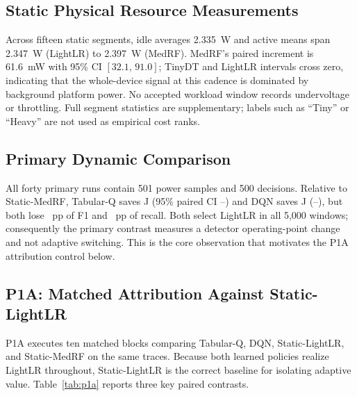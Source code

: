 \subsection{Static Physical Resource Measurements}
Across fifteen static segments, idle averages 2.335~W and active means span 2.347~W (LightLR) to 2.397~W (MedRF). MedRF's paired increment is 61.6~mW with 95\% CI $[32.1,\,91.0]$; TinyDT and LightLR intervals cross zero, indicating that the whole-device signal at this cadence is dominated by background platform power. No accepted workload window records undervoltage or throttling. Full segment statistics are supplementary; labels such as ``Tiny'' or ``Heavy'' are not used as empirical cost ranks.

\subsection{Primary Dynamic Comparison}
All forty primary runs contain 501 power samples and 500 decisions. Relative to Static-MedRF, Tabular-Q saves \TQSavingJ{} J (95\% paired CI \TQSavingJLow{}--\TQSavingJHigh{}) and DQN saves \DQSavingJ{} J (\DQSavingJLow{}--\DQSavingJHigh{}), but both lose \TQFOneDropPP{}~pp of F1 and \TQRecallDropPP{}~pp of recall. Both select LightLR in all 5{,}000 windows; consequently the primary contrast measures a detector operating-point change and not adaptive switching. This is the core observation that motivates the P1A attribution control below.

\subsection{P1A: Matched Attribution Against Static-LightLR}
P1A executes ten matched blocks comparing Tabular-Q, DQN, Static-LightLR, and Static-MedRF on the same traces. Because both learned policies realize LightLR throughout, Static-LightLR is the correct baseline for isolating adaptive value. Table~\ref{tab:p1a} reports three key paired contrasts.

